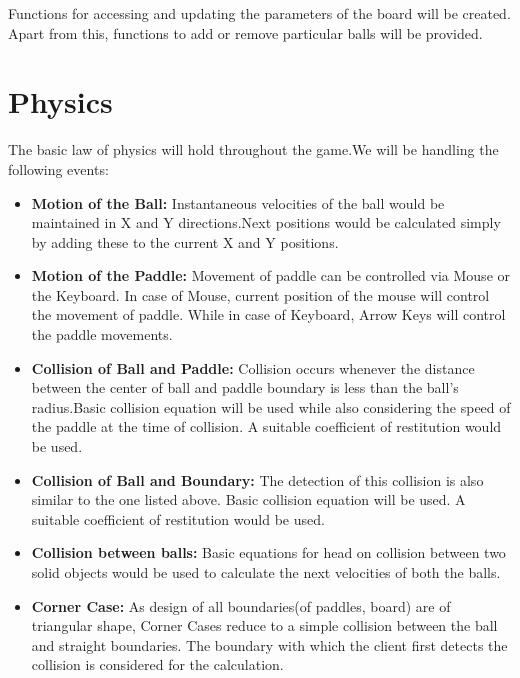 \documentclass{article}
\begin{document}
Functions for accessing and updating the parameters of the board will be created. Apart from this, functions to add or remove particular balls will be provided.

			\section{Physics} 
			\par\noindent The basic law of physics will hold throughout the game.We will be handling the following events:
			\begin{itemize}
			\item \textbf{Motion of the Ball:} Instantaneous velocities of the ball would be maintained in X and Y directions.Next positions would be calculated simply by adding these to the current X and Y positions. 
			\item \textbf{Motion of the Paddle:} Movement of paddle can be controlled via Mouse or the Keyboard. In case of Mouse, current position of the mouse will control the movement of paddle. While in case of Keyboard, Arrow Keys will control the paddle movements.
			\item \textbf{Collision of Ball and Paddle:} Collision occurs whenever the distance between the center of ball and paddle boundary is less than the ball's radius.Basic collision equation will be used while also considering the speed of the paddle at the time of collision. A suitable coefficient of restitution would be used.
			\item \textbf{Collision of Ball and Boundary:} The detection of this collision is also similar to the one listed above. Basic collision equation will be used. A suitable coefficient of restitution would be used.
			\item \textbf{Collision between balls:} Basic equations for head on collision between two solid objects would be used to calculate the next velocities of both the balls.
			\item \textbf{Corner Case:} As design of all boundaries(of paddles, board) are of triangular shape, Corner Cases reduce to a simple collision between the ball and straight boundaries. The boundary with which the client first detects the collision is considered for the calculation.

\end{itemize}
\end{document}
